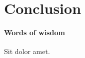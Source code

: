 \documentclass[main.tex]{subfiles}
\begin{document}
\section{Conclusion}\label{s:conclusion}

\paragraph{Words of wisdom} Sit dolor amet.
\end{document}

